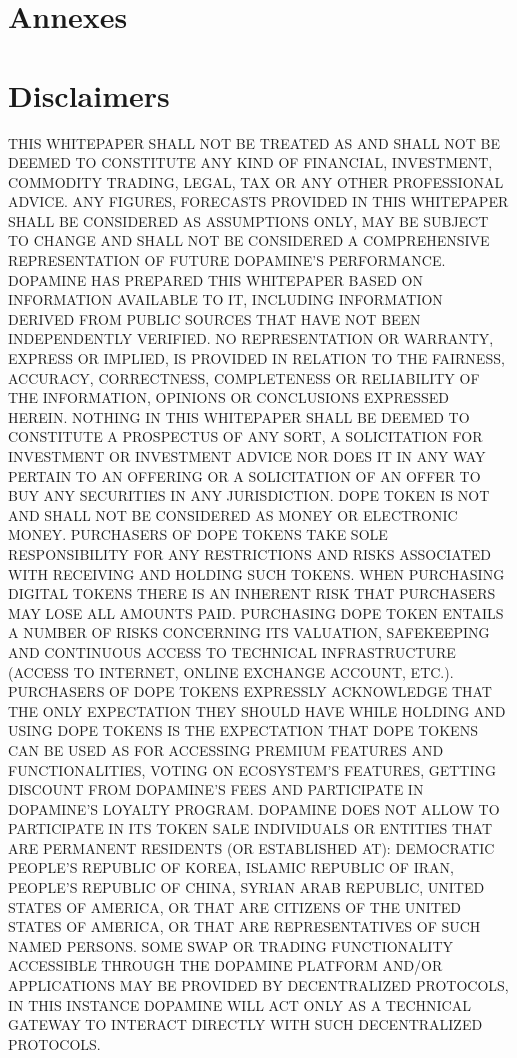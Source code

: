 ﻿\documentclass[a4paper]{article}
\begin{document}
\section{Annexes}


\section{Disclaimers }



THIS WHITEPAPER SHALL NOT BE TREATED AS AND SHALL NOT BE DEEMED TO CONSTITUTE ANY KIND OF FINANCIAL, INVESTMENT, COMMODITY TRADING, LEGAL, TAX OR ANY OTHER PROFESSIONAL ADVICE. ANY FIGURES, FORECASTS PROVIDED IN THIS WHITEPAPER SHALL BE CONSIDERED AS ASSUMPTIONS ONLY, MAY BE SUBJECT TO CHANGE AND SHALL NOT BE CONSIDERED A COMPREHENSIVE REPRESENTATION OF FUTURE  DOPAMINE’S PERFORMANCE.
DOPAMINE HAS PREPARED THIS WHITEPAPER BASED ON INFORMATION AVAILABLE TO IT, INCLUDING INFORMATION DERIVED FROM PUBLIC SOURCES THAT HAVE NOT BEEN INDEPENDENTLY VERIFIED. NO REPRESENTATION OR WARRANTY, EXPRESS OR IMPLIED, IS PROVIDED IN RELATION TO THE FAIRNESS, ACCURACY, CORRECTNESS, COMPLETENESS OR RELIABILITY OF THE INFORMATION, OPINIONS OR CONCLUSIONS EXPRESSED HEREIN.
NOTHING IN THIS WHITEPAPER SHALL BE DEEMED TO CONSTITUTE A PROSPECTUS OF ANY SORT, A SOLICITATION FOR INVESTMENT OR INVESTMENT ADVICE NOR DOES IT IN ANY WAY PERTAIN TO AN OFFERING OR A SOLICITATION OF AN OFFER TO BUY ANY SECURITIES IN ANY JURISDICTION. DOPE TOKEN IS NOT AND SHALL NOT BE CONSIDERED AS MONEY OR ELECTRONIC MONEY.
PURCHASERS OF DOPE TOKENS TAKE SOLE RESPONSIBILITY FOR ANY RESTRICTIONS AND RISKS ASSOCIATED WITH RECEIVING AND HOLDING SUCH TOKENS. WHEN PURCHASING DIGITAL TOKENS THERE IS AN INHERENT RISK THAT PURCHASERS MAY LOSE ALL AMOUNTS PAID. PURCHASING DOPE TOKEN ENTAILS A NUMBER OF RISKS CONCERNING ITS VALUATION, SAFEKEEPING AND CONTINUOUS ACCESS TO TECHNICAL INFRASTRUCTURE (ACCESS TO INTERNET, ONLINE EXCHANGE ACCOUNT, ETC.).
PURCHASERS OF DOPE TOKENS EXPRESSLY ACKNOWLEDGE THAT THE ONLY EXPECTATION THEY SHOULD HAVE WHILE HOLDING AND USING DOPE TOKENS IS THE EXPECTATION THAT DOPE TOKENS CAN BE USED AS FOR ACCESSING PREMIUM FEATURES AND FUNCTIONALITIES, VOTING ON ECOSYSTEM’S FEATURES, GETTING DISCOUNT FROM DOPAMINE’S FEES AND PARTICIPATE IN DOPAMINE’S LOYALTY PROGRAM.
DOPAMINE DOES NOT ALLOW TO PARTICIPATE IN ITS TOKEN SALE INDIVIDUALS OR ENTITIES THAT ARE PERMANENT RESIDENTS (OR ESTABLISHED AT): DEMOCRATIC PEOPLE'S REPUBLIC OF KOREA, ISLAMIC REPUBLIC OF IRAN, PEOPLE’S REPUBLIC OF CHINA, SYRIAN ARAB REPUBLIC, UNITED STATES OF AMERICA, OR THAT ARE CITIZENS OF THE UNITED STATES OF AMERICA, OR THAT ARE REPRESENTATIVES OF SUCH NAMED PERSONS.
SOME SWAP OR TRADING FUNCTIONALITY ACCESSIBLE THROUGH THE DOPAMINE PLATFORM AND/OR APPLICATIONS MAY BE PROVIDED BY DECENTRALIZED PROTOCOLS, IN THIS INSTANCE DOPAMINE WILL ACT ONLY AS A TECHNICAL GATEWAY TO INTERACT DIRECTLY WITH SUCH DECENTRALIZED PROTOCOLS.
 
\end{document}
